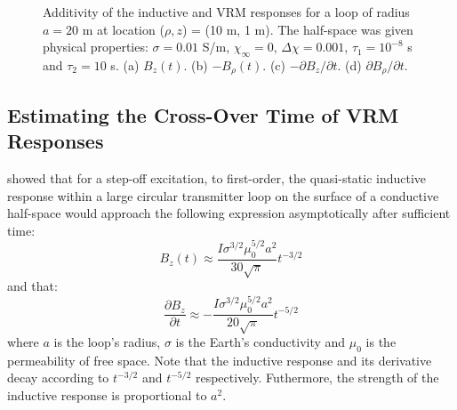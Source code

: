 \documentclass[onecolumn]{IEEEtran} %
\begin{document}
\begin{figure}[!t]
\begin{subfigure}
    \label{figdBrhodtAdditive}
    \end{subfigure}
    \caption{Additivity of the inductive and VRM responses for a loop of radius $a=20$ m at location ($\rho,z$) = (10 m, 1 m). The half-space was given physical properties: $\sigma = 0.01$ S/m, $\chi_{\infty} = 0$, $\Delta \chi = 0.001$, $\tau_1 = 10^{-8}$ s and $\tau_2 = 10$ s. (a) $B_z (t)$. (b) $-B_\rho (t)$. (c) $-\partial B_z/\partial t$. (d) $\partial B_\rho /\partial t$.}
    \label{figVRMrespZadd}
\end{figure}
%


\subsection{Estimating the Cross-Over Time of VRM Responses}
\label{secIndVsVRM}
\cite{Nabighian1979} showed that for a step-off excitation, to first-order, the quasi-static inductive response within a large circular transmitter loop on the surface of a conductive half-space would approach the following expression asymptotically after sufficient time:
\begin{equation}
\label{eqKaufmanB}
B_z(t) \approx \frac{I \sigma^{3/2} \mu_0^{5/2} a^2}{30 \sqrt{\pi}} t^{-3/2}
\end{equation}
and that:
\begin{equation}
\label{eqKaufmandBdt}
\frac{\partial B_z}{\partial t} \approx -\frac{ I \sigma^{3/2} \mu_0^{5/2} a^2}{20 \sqrt{\pi}} t^{-5/2}
\end{equation}
where $a$ is the loop's radius, $\sigma$ is the Earth's conductivity and $\mu_0$ is the permeability of free space. Note that the inductive response and its derivative decay according to $t^{-3/2}$ and $t^{-5/2}$ respectively. Futhermore, the strength of the inductive response is proportional to $a^2$.
\end{document}
